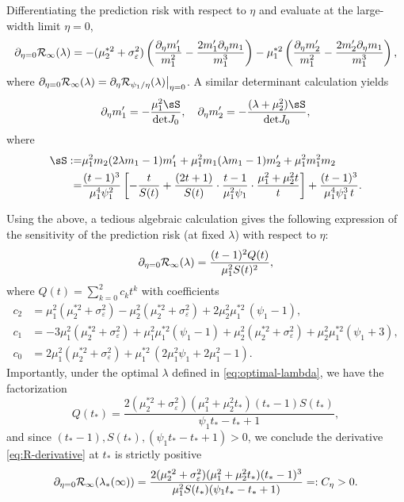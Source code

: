 \documentclass{article} %
\begin{document}
Differentiating the prediction risk with respect to $\eta$ and evaluate at the large-width limit $\eta=0$,
\[
\partial_{\eta=0} {\mathcal R}_{\infty}(\lambda) = -(\mu_2^{*2} + \sigma_\varepsilon^2)\left(\frac{\partial_\eta m_1'}{m_1^2} - \frac{2m_1' \partial_\eta m_1}{m_1^3}\right) -\mu_1^{*2}\left(\frac{\partial_\eta m_2'}{m_1^2} - \frac{2m_2'\partial_\eta m_1}{m_1^3}\right),  
\]
where $\partial_{\eta=0} {\mathcal R}_{\infty}(\lambda) = \partial_\eta {\mathcal R}_{\psi_1/\eta}(\lambda) \big|_{\eta=0}$. 
A similar determinant calculation yields
\[
\partial_\eta m_1' = -\frac{\mu_1^2\sS}{\mathrm{det}J_0}, \quad \partial_\eta m_2' = -\frac{(\lambda+\mu_2^2)\sS}{\mathrm{det}J_0},
\]
where 
\begin{align*}
\sS :=& \mu_1^2 m_2(2\lambda m_1-1) m_1' + \mu_1^2 m_1(\lambda m_1-1)  m_2' + \mu_1^2 m_1^2 m_2 
\\ 
=& \frac{(t-1)^3}{\mu_1^4\psi_1^2}\left[-\frac{t}{S(t)}
+\frac{(2t+1)}{S(t)}\cdot\frac{t-1}{\mu_1^2\psi_1}\cdot\frac{\mu_1^2+\mu_2^2t}{t}\right]
+\frac{(t-1)^3}{\mu_1^4\psi_1^3\,t}.
\end{align*}


Using the above, a tedious algebraic calculation gives the following expression of the sensitivity of the prediction risk (at fixed $\lambda$) with respect to $\eta$:
\begin{align}
    \partial_{\eta=0} {\mathcal R}_{\infty}(\lambda) = \frac{(t-1)^2 Q(t)}{\mu_1^2S(t)^2}, \label{eq:R-derivative}
\end{align}
where $Q(t)=\sum_{k=0}^2 c_k t^k$ with coefficients
\begin{align*}
c_2&=\mu_1^2(\mu_2^{*2} + \sigma_\varepsilon^2) - \mu_2^2(\mu_2^{*2} + \sigma_\varepsilon^2) + 2\mu_2^2\mu_1^{*2}\,(\psi_1-1),\\
c_1&=-3\mu_1^2(\mu_2^{*2} + \sigma_\varepsilon^2) + \mu_1^2\mu_1^{*2}(\psi_1-1) + \mu_2^2(\mu_2^{*2} + \sigma_\varepsilon^2) + \mu_2^2\mu_1^{*2}(\psi_1+3),\\
c_0&=2\mu_1^2(\mu_2^{*2} + \sigma_\varepsilon^2) + \mu_1^{*2}\,(2\mu_1^2\psi_1+2\mu_1^2-1).
\end{align*}
Importantly, under the optimal $\lambda$ defined in \eqref{eq:optimal-lambda}, we have the factorization
\[
Q(t_*) = \frac{2(\mu_2^{*2} + \sigma_\varepsilon^2)(\mu_1^2+\mu_2^2t_*)(t_*-1)S(t_*)}{\psi_1 t_*-t_*+1}, 
\]
and since $(t_*-1), S(t_*), (\psi_1 t_* -t_*+1)>0$, we conclude the derivative \eqref{eq:R-derivative} at $t_*$ is strictly positive
\begin{align}
    \partial_{\eta=0} {\mathcal R}_{\infty}(\lambda_*(\infty)) = \frac{2(\mu_2^{*2} + \sigma_\varepsilon^2) (\mu_1^2+\mu_2^2t_*)(t_*-1)^3}{\mu_1^2S(t_*)(\psi_1 t_*-t_*+1)} =: C_\eta > 0. 
    \label{eq:C-eta}
\end{align}
\end{document}
